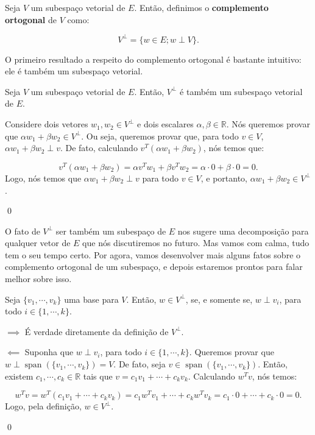 \begin{Definition}
	Seja $V$ um subespaço vetorial de $E$. Então, definimos o \textbf{complemento ortogonal} de $V$ como:
	
	$$
	V^\perp = \{w\in E; w\perp V\}.
	$$
\end{Definition}

O primeiro resultado a respeito do complemento ortogonal é bastante intuitivo: ele é também um subespaço vetorial.

\begin{Proposition}
	Seja $V$ um subespaço vetorial de $E$. Então, $V^\perp$ é também um subespaço vetorial de $E$.
\end{Proposition}

\begin{Proof}
	Considere dois vetores $w_1, w_2\in V^\perp$ e dois escalares $\alpha, \beta\in\mathbb{R}$. Nós queremos provar que $\alpha w_1 + \beta w_2\in V^\perp$. Ou seja, queremos provar que, para todo $v\in V$, $\alpha w_1 + \beta w_2\perp v$. De fato, calculando $v^T(\alpha w_1 + \beta w_2)$, nós temos que:
	
	$$
	v^T(\alpha w_1 + \beta w_2) = \alpha v^Tw_1 + \beta v^Tw_2 = \alpha\cdot 0 + \beta\cdot 0 = 0.
	$$
	Logo, nós temos que $\alpha w_1 + \beta w_2\perp v$ para todo $v\in V$, e portanto, $\alpha w_1 + \beta w_2\in V^\perp$.
	
	\qed
\end{Proof}

O fato de $V^\perp$ ser também um subespaço de $E$ nos sugere uma decomposição para qualquer vetor de $E$ que nós discutiremos no futuro. Mas vamos com calma, tudo tem o seu tempo certo. Por agora, vamos desenvolver mais alguns fatos sobre o complemento ortogonal de um subespaço, e depois estaremos prontos para falar melhor sobre isso.

\begin{Proposition}
	Seja $\{v_1, \cdots, v_k\}$ uma base para $V$. Então, $w\in V^\perp$, se, e somente se, $w\perp v_i$, para todo $i\in\{1, \cdots, k\}$.
\end{Proposition}

\begin{Proof}
	$\implies$ É verdade diretamente da definição de $V^\perp$.
	
	$\impliedby$ Suponha que $w\perp v_i$, para todo $i\in\{1, \cdots, k\}$. Queremos provar que $w\perp\operatorname{span}(\{v_1, \cdots, v_k\}) = V$. De fato, seja $v\in\operatorname{span}(\{v_1, \cdots, v_k\})$. Então, existem $c_1, \cdots, c_k\in\mathbb{R}$ tais que $v = c_1v_1 + \cdots + c_kv_k$. Calculando $w^Tv$, nós temos:
	
	$$
	w^Tv = w^T(c_1v_1 + \cdots + c_kv_k) = c_1w^Tv_1 + \cdots + c_kw^Tv_k = c_1\cdot 0 + \cdots + c_k\cdot 0 = 0. 
	$$
	Logo, pela definição, $w\in V^\perp$.
	
	\qed
\end{Proof}

